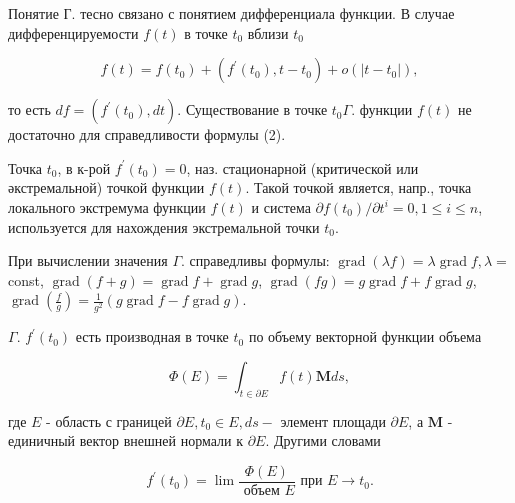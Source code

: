 \documentclass[10pt]{article}
\begin{document}
Понятие Г. тесно связано с понятием дифференциала функции. В случае дифференцируемости $f(t)$ в точке $t_{0}$ вблизи $t_{0}$



\[

f(t)=f\left(t_{0}\right)+\left(f^{\prime}\left(t_{0}\right), t-t_{0}\right)+o\left(\left|t-t_{0}\right|\right),

\]



то есть $d f=\left(f^{\prime}\left(t_{0}\right), d t\right)$. Существование в точке $t_{0} \Gamma$. функции $f(t)$ не достаточно для справедливости формулы (2).



Точка $t_{0}$, в к-рой $f^{\prime}\left(t_{0}\right)=0$, наз. стационарной (критической или әкстремальной) точкой функции $f(t)$. Такой точкой является, напр., точка локального экстремума функции $f(t)$ и система $\partial f\left(t_{0}\right) / \partial t^{i}=0,1 \leqslant i \leqslant n$, используется для нахождения экстремальной точки $t_{0}$.



При вычислении значения $\Gamma$. справедливы формулы: $\operatorname{grad}(\lambda f)=\lambda \operatorname{grad} f, \lambda=$ const, $\operatorname{grad}(f+g)=\operatorname{grad} f+\operatorname{grad} g$, $\operatorname{grad}(f g)=g \operatorname{grad} f+f \operatorname{grad} g$, $\operatorname{grad}\left(\frac{f}{g}\right)=\frac{1}{g^{2}}(g \operatorname{grad} f-f \operatorname{grad} g)$.



$\Gamma$. $f^{\prime}\left(t_{0}\right)$ есть производная в точке $t_{0}$ по объему векторной функции объема



\[

\Phi(E)=\int_{t \in \partial E} f(t) \boldsymbol{M} d s,

\]



где $E$ - область с границей $\partial E, t_{0} \in E, d s-$ элемент площади $\partial E$, а $\boldsymbol{M}$ - единичный вектор внешней нормали к $\partial E$. Другими словами



\[

f^{\prime}\left(t_{0}\right)=\lim \frac{\Phi(E)}{\text { объем } E} \text { при } E \longrightarrow t_{0} .

\]
\end{document}
